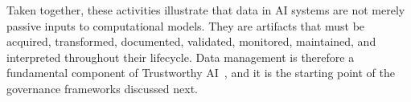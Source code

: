

Taken together, these activities illustrate that data in AI systems are not merely passive inputs to computational models. They are artifacts that must be acquired, transformed, documented, validated, monitored, maintained, and interpreted throughout their lifecycle. Data management is therefore a fundamental component of Trustworthy AI~\cite{hamon_robustness_2020}, and it is the starting point of the governance frameworks discussed next.

